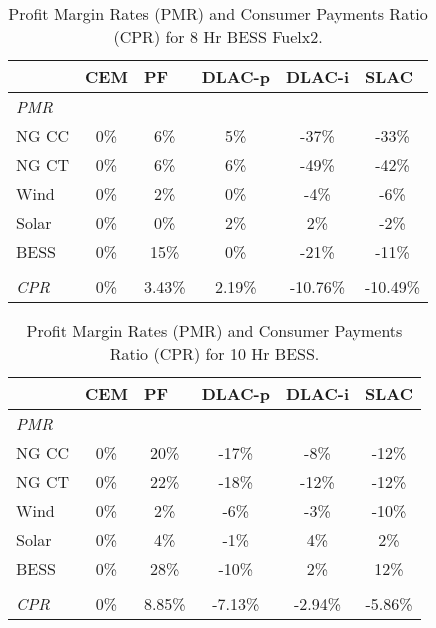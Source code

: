 \documentclass{article}
\begin{document}
\begin{table}[ht]
\centering
\begin{tabular}{lccccc}
\toprule
& \multicolumn{1}{l}{\textbf{CEM}} 
& \multicolumn{1}{l}{\textbf{PF}} 
& \multicolumn{1}{l}{\textbf{DLAC-p}} 
& \multicolumn{1}{l}{\textbf{DLAC-i}} 
& \multicolumn{1}{l}{\textbf{SLAC}} 
 \\ \hline
\midrule
\textit{PMR} & & & & \\
\quad NG CC & 0\% & 6\% & 5\% & -37\% & -33\% \\
\quad NG CT & 0\% & 6\% & 6\% & -49\% & -42\% \\
\quad Wind & 0\% & 2\% & 0\% & -4\% & -6\% \\
\quad Solar & 0\% & 0\% & 2\% & 2\% & -2\% \\
\quad BESS & 0\% & 15\% & 0\% & -21\% & -11\% \\
& & & & \\
\textit{CPR} & 0\% & 3.43\% & 2.19\% & -10.76\% & -10.49\% \\
\bottomrule
\end{tabular}
\caption{Profit Margin Rates (PMR) and Consumer Payments Ratio (CPR) for 8 Hr BESS Fuelx2.}
\label{table:8_Hr_BESS_Fuelx2_pmr}
\end{table}

\begin{table}[ht]
\centering
\begin{tabular}{lccccc}
\toprule
& \multicolumn{1}{l}{\textbf{CEM}} 
& \multicolumn{1}{l}{\textbf{PF}} 
& \multicolumn{1}{l}{\textbf{DLAC-p}} 
& \multicolumn{1}{l}{\textbf{DLAC-i}} 
& \multicolumn{1}{l}{\textbf{SLAC}} 
 \\ \hline
\midrule
\textit{PMR} & & & & \\
\quad NG CC & 0\% & 20\% & -17\% & -8\% & -12\% \\
\quad NG CT & 0\% & 22\% & -18\% & -12\% & -12\% \\
\quad Wind & 0\% & 2\% & -6\% & -3\% & -10\% \\
\quad Solar & 0\% & 4\% & -1\% & 4\% & 2\% \\
\quad BESS & 0\% & 28\% & -10\% & 2\% & 12\% \\
& & & & \\
\textit{CPR} & 0\% & 8.85\% & -7.13\% & -2.94\% & -5.86\% \\
\bottomrule
\end{tabular}
\caption{Profit Margin Rates (PMR) and Consumer Payments Ratio (CPR) for 10 Hr BESS.}
\label{table:10_Hr_BESS_pmr}
\end{table}
\end{document}
